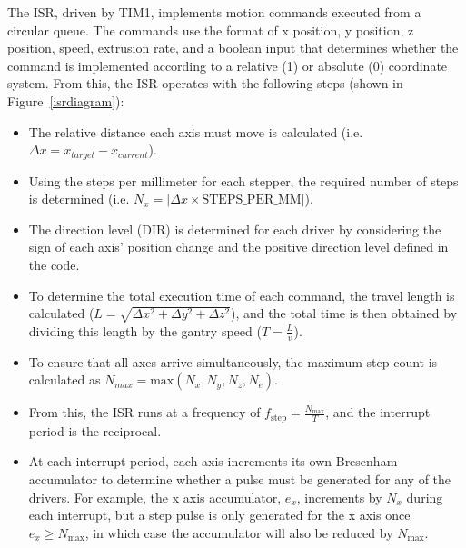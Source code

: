 The ISR, driven by TIM1, implements motion commands executed from a circular queue. The commands use the format of x position, y position, z position, speed, extrusion rate, and a boolean input that determines whether the command is implemented according to a relative (1) or absolute (0) coordinate system. From this, the ISR operates with the following steps (shown in Figure~\ref{isrdiagram}):
\begin{itemize}
    \item The relative distance each axis must move is calculated (i.e. $\Delta x=x_{target}-x_{current}$).
    
    \item Using the steps per millimeter for each stepper, the required number of steps is determined (i.e. $N_x=|\Delta x \times \text{STEPS\_PER\_MM}| $).

    \item The direction level (DIR) is determined for each driver by considering the sign of each axis' position change and the positive direction level defined in the code.

    \item To determine the total execution time of each command, the travel length is calculated ($L=\sqrt{\Delta x^2+\Delta y^2+\Delta z^2}$), and the total time is then obtained by dividing this length by the gantry speed ($T=\frac{L}{v}$).

    \item To ensure that all axes arrive simultaneously, the maximum step count is calculated as $N_{max}=\text{max}(N_x,N_y,N_z,N_e)$.

    \item From this, the ISR runs at a frequency of $f_{\text{step}}=\frac{N_{\text{max}}}{T}$, and the interrupt period is the reciprocal.

    \item At each interrupt period, each axis increments its own Bresenham accumulator to determine whether a pulse must be generated for any of the drivers. For example, the x axis accumulator, $e_x$, increments by $N_x$ during each interrupt, but a step pulse is only generated for the x axis once $e_x\ge N_\text{max}$, in which case the accumulator will also be reduced by $N_\text{max}$.
\end{itemize}



